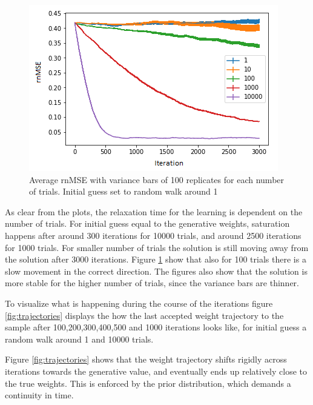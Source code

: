 \begin{figure}[hbt!]
\caption{Average rnMSE with variance bars of 100 replicates for each number of trials. Initial guess set to random walk around 1}
\label{fig:MSE2}
    \centering
    \includegraphics[scale=0.8]{fig/MSE_starting_away_wa.png}
\end{figure}

As clear from the plots, the relaxation time for the learning is dependent on the number of trials. For initial guess equal to the generative weights, saturation happens after around 300 iterations for 10000 trials, and around 2500 iterations for 1000 trials. For smaller number of trials the solution is still moving away from the solution after 3000 iterations. Figure \ref{fig:MSE2} show that also for 100 trials there is a slow movement in the correct direction. The figures also show that the solution is more stable for the higher number of trials, since the variance bars are thinner.  

To visualize what is happening during the course of the iterations figure \ref{fig:trajectories} displays the how the last accepted weight trajectory to the sample after 100,200,300,400,500 and 1000 iterations looks like, for initial guess a random walk around 1 and 10000 trials. 

Figure \ref{fig:trajectories} shows that the weight trajectory shifts rigidly across iterations towards the generative value, and eventually ends up relatively close to the true weights. This is enforced by the prior distribution, which demands a continuity in time. 

